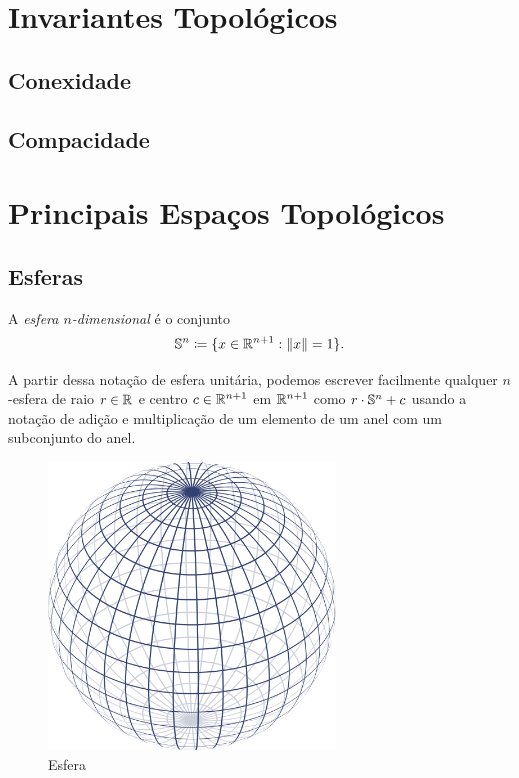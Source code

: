 \chapter{Invariantes Topológicos}

\section{Conexidade}

\section{Compacidade}
















\chapter{Principais Espaços Topológicos}

\section{Esferas}

\begin{defi}
	A \emph{esfera $n$-dimensional} é o conjunto
	\begin{equation*}
	\Es^n \coloneqq \{x \in \R^{n+1}: \nor{x}=1\}.
	\end{equation*}
\end{defi}

A partir dessa notação de esfera unitária, podemos escrever facilmente qualquer $n$-esfera de raio $r \in \mathbb{R}$ e centro $c \in \mathbb{R}^{n+1}$ em $\mathbb{R}^{n+1}$ como $r \cdot \mathbb{S}^n + c$ usando a notação de adição e multiplicação de um elemento de um anel com um subconjunto do anel.

\begin{figure}[!h]
\centering
\includegraphics[width=3in]{./imagens/esfera}
\caption{Esfera}
\end{figure}


